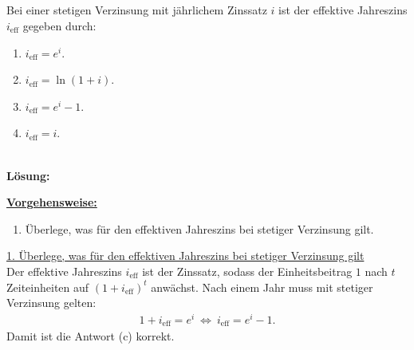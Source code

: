 \subsection*{}
Bei einer stetigen Verzinsung mit jährlichem Zinssatz $i$ ist der effektive Jahreszins $i_{\mathrm{eff}}$ gegeben durch:
\renewcommand{\labelenumi}{(\alph{enumi})}
\begin{enumerate}
	\item 
	$i_{\mathrm{eff}} = e^i$.
	\item
	$i_{\mathrm{eff}} = \ln(1+ i)$.
	\item
	$i_{\mathrm{eff}} = e^i -1$.
	\item
	$i_{\mathrm{eff}} = i$.
\end{enumerate}
\ \\
\textbf{Lösung:}
\begin{mdframed}
\underline{\textbf{Vorgehensweise:}}
\renewcommand{\labelenumi}{\theenumi.}
\begin{enumerate}
\item Überlege, was für den effektiven Jahreszins bei stetiger Verzinsung gilt.
\end{enumerate}
\end{mdframed}

\underline{1. Überlege, was für den effektiven Jahreszins bei stetiger Verzinsung gilt}\\
Der effektive Jahreszins $i_{\mathrm{eff}}$ ist der Zinssatz, sodass der Einheitsbeitrag $1$ nach $t$ Zeiteinheiten auf $(1+ i_{\mathrm{eff}})^t$ anwächst.
Nach einem Jahr muss mit stetiger Verzinsung gelten:
\begin{align*}
	1+ i_{\mathrm{eff}} = e^i
	\ \Leftrightarrow \
	 i_{\mathrm{eff}} = e^i -1.
\end{align*}
Damit ist die Antwort (c) korrekt.



\newpage
